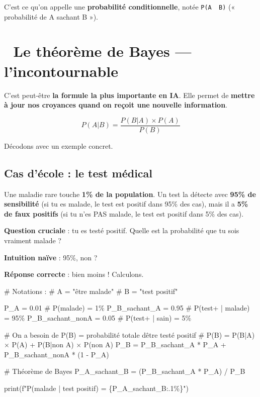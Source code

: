 \documentclass[
  french,
  11pt,
  a4paper,
]{scrbook}
\newenvironment{Shaded}{}{}
\newcommand{\BuiltInTok}[1]{\textcolor[rgb]{0.84,0.23,0.29}{#1}}
\newcommand{\CommentTok}[1]{\textcolor[rgb]{0.42,0.45,0.49}{#1}}
\newcommand{\DecValTok}[1]{\textcolor[rgb]{0.00,0.36,0.77}{#1}}
\newcommand{\FloatTok}[1]{\textcolor[rgb]{0.00,0.36,0.77}{#1}}
\newcommand{\NormalTok}[1]{\textcolor[rgb]{0.14,0.16,0.18}{#1}}
\newcommand{\OperatorTok}[1]{\textcolor[rgb]{0.14,0.16,0.18}{#1}}
\newcommand{\SpecialCharTok}[1]{\textcolor[rgb]{0.00,0.36,0.77}{#1}}
\newcommand{\SpecialStringTok}[1]{\textcolor[rgb]{0.01,0.18,0.38}{#1}}
\begin{document}
C'est ce qu'on appelle une \textbf{probabilité conditionnelle}, notée
\texttt{P(A\ \textbar{}\ B)} (« probabilité de A sachant B »).

\section{🧠 Le théorème de Bayes ---
l'incontournable}\label{le-thuxe9oruxe8me-de-bayes-lincontournable}

C'est peut-être \textbf{la formule la plus importante en IA}. Elle
permet de \textbf{mettre à jour nos croyances quand on reçoit une
nouvelle information}.

\[P(A | B) = \frac{P(B | A) \times P(A)}{P(B)}\]

Décodons avec un exemple concret.

\subsection{Cas d'école : le test
médical}\label{cas-duxe9cole-le-test-muxe9dical}

Une maladie rare touche \textbf{1\% de la population}. Un test la
détecte avec \textbf{95\% de sensibilité} (si tu es malade, le test est
positif dans 95\% des cas), mais il a \textbf{5\% de faux positifs} (si
tu n'es PAS malade, le test est positif dans 5\% des cas).

\textbf{Question cruciale} : tu es testé positif. Quelle est la
probabilité que tu sois vraiment malade ?

\textbf{Intuition naïve} : 95\%, non ?

\textbf{Réponse correcte} : bien moins ! Calculons.

\begin{Shaded}
\begin{Highlighting}[]
\CommentTok{\# Notations :}
\CommentTok{\# A = "être malade"}
\CommentTok{\# B = "test positif"}

\NormalTok{P\_A }\OperatorTok{=} \FloatTok{0.01}          \CommentTok{\# P(malade) = 1\%}
\NormalTok{P\_B\_sachant\_A }\OperatorTok{=} \FloatTok{0.95}  \CommentTok{\# P(test+ | malade) = 95\%}
\NormalTok{P\_B\_sachant\_nonA }\OperatorTok{=} \FloatTok{0.05}  \CommentTok{\# P(test+ | sain) = 5\%}

\CommentTok{\# On a besoin de P(B) = probabilité totale d\textquotesingle{}être testé positif}
\CommentTok{\# P(B) = P(B|A) × P(A) + P(B|non A) × P(non A)}
\NormalTok{P\_B }\OperatorTok{=}\NormalTok{ P\_B\_sachant\_A }\OperatorTok{*}\NormalTok{ P\_A }\OperatorTok{+}\NormalTok{ P\_B\_sachant\_nonA }\OperatorTok{*}\NormalTok{ (}\DecValTok{1} \OperatorTok{{-}}\NormalTok{ P\_A)}

\CommentTok{\# Théorème de Bayes}
\NormalTok{P\_A\_sachant\_B }\OperatorTok{=}\NormalTok{ (P\_B\_sachant\_A }\OperatorTok{*}\NormalTok{ P\_A) }\OperatorTok{/}\NormalTok{ P\_B}

\BuiltInTok{print}\NormalTok{(}\SpecialStringTok{f"P(malade | test positif) = }\SpecialCharTok{\{}\NormalTok{P\_A\_sachant\_B}\SpecialCharTok{:.1\%\}}\SpecialStringTok{"}\NormalTok{)}
\end{Highlighting}
\end{Shaded}
\end{document}
